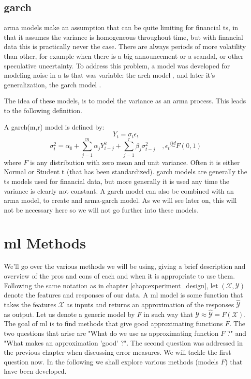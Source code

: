 \subsection{\acrshort{garch}}
\label{subsec:garch}
\acrshort{arma} models make an assumption that can be quite limiting for financial \acrlong{ts}, in that it assumes the variance is homogeneous throughout time, but with financial data this is practically never the case. There are always periods of more volatility than other, for example when there is a big announcement or a scandal, or other speculative uncertainty. 
To address this problem, a model was developed for modeling noise in a \acrlong{ts} that was variable: the \acrfull{arch} model \cite{ARCHpaper}, and later it's generalization, the \acrfull{garch} model \cite{GARCHpaper}.

The idea of these models, is to model the variance as an \acrshort{arma} process. This leads to the following definition.

A \acrshort{garch}(m,r) model is defined by:
$$
Y_t = \sigma_t \epsilon_t
$$
$$
\sigma_t^2 = \alpha_0 + \sum_{j=1}^m \alpha_j Y_{t-j}^2 + \sum_{j=1}^r \beta_j \sigma_{t-j}^2
\quad, \epsilon_t \stackrel{iid}{\sim} F(0,1)
$$
where $F$ is any distribution with zero mean and unit variance. Often it is either Normal or Student t (that has been standardized).
\acrshort{garch} models are generally the \acrlong{ts} models used for financial data, but more generally it is used any time the variance is clearly not constant. A \acrshort{garch} model can also be combined with an \acrshort{arma} model, to create and \acrshort{arma}-\acrshort{garch} model. As we will see later on, this will not be necessary here so we will not go further into these models.

\section{\acrshort{ml} Methods}
We'll go over the various methods we will be using, giving a brief description and overview of the pros and cons of each and when it is appropriate to use them.
Following the same notation as in chapter \ref{chap:experiment_design}, let $(\mathcal{X},\mathcal{Y})$ denote the features and responses of our data. A \acrshort{ml} model is some function that takes the features $\mathcal{X}$ as inputs and returns an approximation of the responses $\hat{\mathcal{Y}}$ as output. Let us denote a generic model by $F$ in such way that $\mathcal{Y} \approx \hat{\mathcal{Y}}=F(\mathcal{X})$.
The goal of \acrshort{ml} is to find methods that give good approximating functions $F$. The two questions that arise are "What do we use as approximating function $F$ ?" and "What makes an approximation 'good' ?". The second question was addressed in the previous chapter when discussing error measures. We will tackle the first question now. In the following we shall explore various methods (models $F$) that have been developed.

